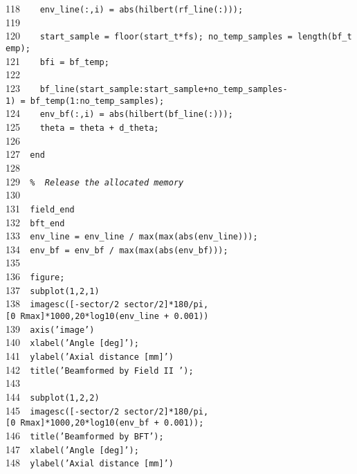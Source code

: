 \documentclass{manual}
\begin{document}
{118{\tt~~}{\tt ~~env\_line(:,i)~=~abs(hilbert(rf\_line(:)));}\\
119{\tt~~}{\tt }\\
120{\tt~~}{\tt ~~start\_sample~=~floor(start\_t*fs);~no\_temp\_samples~=~length(bf\_temp);}\\
121{\tt~~}{\tt ~~bf{i}~=~bf\_temp;}\\
122{\tt~~}{\tt ~~}\\
123{\tt~~}{\tt ~~bf\_line(start\_sample:start\_sample+no\_temp\_samples-1)~=~bf\_temp(1:no\_temp\_samples);}\\
124{\tt~~}{\tt ~~env\_bf(:,i)~=~abs(hilbert(bf\_line(:)));}\\
125{\tt~~}{\tt ~~theta~=~theta~+~d\_theta;}\\
126{\tt~~}{\tt }\\
127{\tt~~}{\tt end}\\
128{\tt~~}{\tt }\\
129{\tt~~}{\tt {\sl \%~~Release~the~allocated~memory}}\\
130{\tt~~}{\tt }\\
131{\tt~~}{\tt field\_end}\\
132{\tt~~}{\tt bft\_end}\\
133{\tt~~}{\tt env\_line~=~env\_line~/~max(max(abs(env\_line)));}\\
134{\tt~~}{\tt env\_bf~=~env\_bf~/~max(max(abs(env\_bf)));}\\
135{\tt~~}{\tt }\\
136{\tt~~}{\tt figure;}\\
137{\tt~~}{\tt subplot(1,2,1)}\\
138{\tt~~}{\tt imagesc([-sector/2~sector/2]*180/pi,[0~Rmax]*1000,20*log10(env\_line~+~0.001))}\\
139{\tt~~}{\tt axis('image')}\\
140{\tt~~}{\tt xlabel('Angle~[deg]');}\\
141{\tt~~}{\tt ylabel('Axial~distance~[mm]')}\\
142{\tt~~}{\tt title('Beamformed~by~Field~II~');}\\
143{\tt~~}{\tt }\\
144{\tt~~}{\tt subplot(1,2,2)}\\
145{\tt~~}{\tt imagesc([-sector/2~sector/2]*180/pi,[0~Rmax]*1000,20*log10(env\_bf~+~0.001));}\\
146{\tt~~}{\tt title('Beamformed~by~BFT');}\\
147{\tt~~}{\tt xlabel('Angle~[deg]');}\\
148{\tt~~}{\tt ylabel('Axial~distance~[mm]')}\\
}
\end{document}
